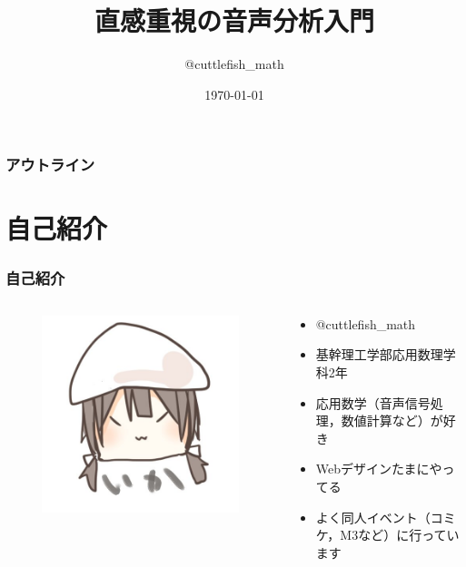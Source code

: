 \documentclass[unicode,11pt]{beamer}
\title{直感重視の音声分析入門}
\author{@cuttlefish\_math}
\date{\today}
\institute{基幹理工学部 応用数理学科 2年}
\begin{document}
\begin{frame}
  \titlepage
\end{frame}

\begin{frame}
  \frametitle{アウトライン}
  \begin{multicols}{2}
    \tableofcontents
  \end{multicols}
\end{frame}

\section{自己紹介}
\begin{frame}
  \frametitle{自己紹介}
  \begin{columns}
    \begin{column}{0.3\textwidth}
      \begin{figure}
        \centering
        \includegraphics[width=\columnwidth,pagebox=cropbox]{./figure/cuttlefish_math.jpeg}
      \end{figure}
    \end{column}
    \begin{column}{0.7\textwidth}
      \begin{itemize}
        \item @cuttlefish\_math
        \item 基幹理工学部応用数理学科2年
        \item 応用数学（音声信号処理，数値計算など）が好き
        \item Webデザインたまにやってる
        \item よく同人イベント（コミケ，M3など）に行っています
      \end{itemize}
    \end{column}
  \end{columns}
\end{frame}
\end{document}
